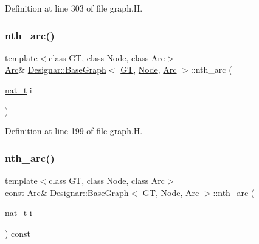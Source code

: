 Definition at line 303 of file graph.\+H.

\mbox{\label{class_designar_1_1_base_graph_a205d350fd588082a84d7a114ffd7cf5e}} 
\subsubsection{\texorpdfstring{nth\+\_\+arc()}{nth\_arc()}\hspace{0.1cm}{\footnotesize\ttfamily [1/2]}}
{\footnotesize\ttfamily template$<$class GT, class Node, class Arc$>$ \\
\hyperlink{namespace_designar_a3f55fb5513d62ff47cbc8f72b8e95d6f}{Arc}\& \hyperlink{class_designar_1_1_base_graph}{Designar\+::\+Base\+Graph}$<$ \hyperlink{demo-buildgraph_8_c_a3001c40d2c31ca87ed96cd7d1334a55e}{GT}, \hyperlink{namespace_designar_a5af326c65aa2bd26b26c410f2030d09e}{Node}, \hyperlink{namespace_designar_a3f55fb5513d62ff47cbc8f72b8e95d6f}{Arc} $>$\+::nth\+\_\+arc (\begin{DoxyParamCaption}\item[{\hyperlink{namespace_designar_aa72662848b9f4815e7bf31a7cf3e33d1}{nat\+\_\+t}}]{i }\end{DoxyParamCaption})\hspace{0.3cm}{\ttfamily [inline]}}



Definition at line 199 of file graph.\+H.

\mbox{\label{class_designar_1_1_base_graph_aaff3c76e0e0094d4ec1eaecd155ca951}} 
\subsubsection{\texorpdfstring{nth\+\_\+arc()}{nth\_arc()}\hspace{0.1cm}{\footnotesize\ttfamily [2/2]}}
{\footnotesize\ttfamily template$<$class GT, class Node, class Arc$>$ \\
const \hyperlink{namespace_designar_a3f55fb5513d62ff47cbc8f72b8e95d6f}{Arc}\& \hyperlink{class_designar_1_1_base_graph}{Designar\+::\+Base\+Graph}$<$ \hyperlink{demo-buildgraph_8_c_a3001c40d2c31ca87ed96cd7d1334a55e}{GT}, \hyperlink{namespace_designar_a5af326c65aa2bd26b26c410f2030d09e}{Node}, \hyperlink{namespace_designar_a3f55fb5513d62ff47cbc8f72b8e95d6f}{Arc} $>$\+::nth\+\_\+arc (\begin{DoxyParamCaption}\item[{\hyperlink{namespace_designar_aa72662848b9f4815e7bf31a7cf3e33d1}{nat\+\_\+t}}]{i }\end{DoxyParamCaption}) const\hspace{0.3cm}{\ttfamily [inline]}}



